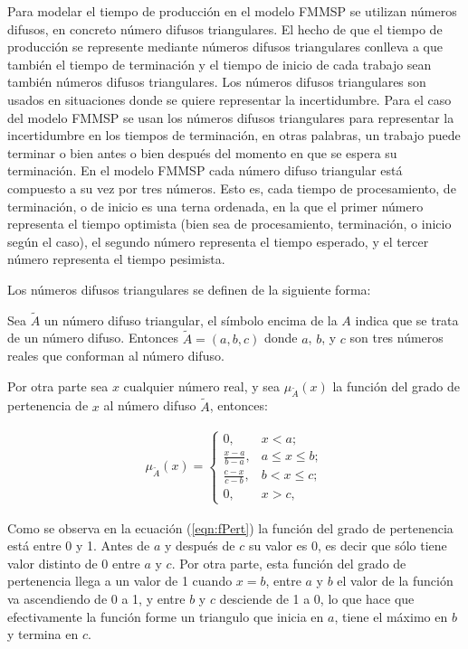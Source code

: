 \documentclass{article}
\begin{document}
\vspace{\baselineskip}
Para modelar el tiempo de producción en el modelo FMMSP se utilizan números
difusos, en concreto número difusos triangulares. El hecho de que el tiempo
de producción se represente mediante números difusos triangulares conlleva
a que también el tiempo de terminación y el tiempo de inicio de cada trabajo
sean también números difusos triangulares. Los números difusos
triangulares son usados en situaciones donde se quiere representar la
incertidumbre. Para el caso del modelo FMMSP se usan los números difusos
triangulares para representar la incertidumbre en los tiempos de terminación,
en otras palabras, un trabajo puede terminar o bien antes o bien después
del momento en que se espera su terminación. En el modelo FMMSP cada número
difuso triangular está compuesto a su vez por tres números. Esto es, cada
tiempo de procesamiento, de terminación, o de inicio es una terna ordenada, 
en la que el primer número representa el tiempo optimista (bien sea de 
procesamiento, terminación, o inicio según el caso), el segundo número 
representa el tiempo esperado, y el tercer número representa el tiempo
pesimista. \autocite{modFMMSP}

\vspace{\baselineskip}
Los números difusos triangulares se definen de la siguiente forma: 
\autocite{fuzzyNum}

\vspace{\baselineskip}
Sea $\tilde{A}$ un número difuso triangular, el símbolo encima de la $A$ indica
que se trata de un número difuso. Entonces $\tilde{A} = (a,b,c)$ donde $a$, 
$b$, y $c$ son tres números reales que conforman al número difuso.

Por otra parte sea $x$ cualquier número real, y sea $\mu_{\tilde{A}}(x)$ la 
función del grado de pertenencia de $x$ al número difuso $\tilde{A}$, entonces:

\begin{align}
    \label{eqn:fPert}
    \mu_{\tilde{A}}(x) =
    \begin{cases}
        0,   & x < a;\\
        \frac{x-a}{b-a},   & a \leq x \leq b;\\
        \frac{c-x}{c-b},   & b < x \leq c;\\
        0,   & x > c,
    \end{cases}
\end{align}

Como se observa en la ecuación (\ref{eqn:fPert}) la función del grado de
pertenencia está entre 0 y 1. Antes de $a$ y después de $c$ su valor es 0, es
decir que sólo tiene valor distinto de 0 entre $a$ y $c$. Por otra parte, esta
función del grado de pertenencia llega a un valor de 1 cuando $x = b$, entre
$a$ y $b$ el valor de la función va ascendiendo de 0 a 1, y entre $b$ y $c$
desciende de 1 a 0, lo que hace que efectivamente la función forme un triangulo
que inicia en $a$, tiene el máximo en $b$ y termina en $c$. \autocite{fuzzyNum}
\end{document}
